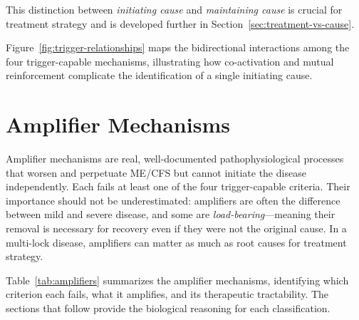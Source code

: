 This distinction between \emph{initiating cause} and \emph{maintaining cause} is crucial for treatment strategy and is developed further in Section~\ref{sec:treatment-vs-cause}.

Figure~\ref{fig:trigger-relationships} maps the bidirectional interactions among the four trigger-capable mechanisms, illustrating how co-activation and mutual reinforcement complicate the identification of a single initiating cause.





\section{Amplifier Mechanisms}
\label{sec:amplifiers}

Amplifier mechanisms are real, well-documented pathophysiological processes that worsen and perpetuate ME/CFS but cannot initiate the disease independently. Each fails at least one of the four trigger-capable criteria. Their importance should not be underestimated: amplifiers are often the difference between mild and severe disease, and some are \emph{load-bearing}---meaning their removal is necessary for recovery even if they were not the original cause. In a multi-lock disease, amplifiers can matter as much as root causes for treatment strategy.

Table~\ref{tab:amplifiers} summarizes the amplifier mechanisms, identifying which criterion each fails, what it amplifies, and its therapeutic tractability. The sections that follow provide the biological reasoning for each classification.

